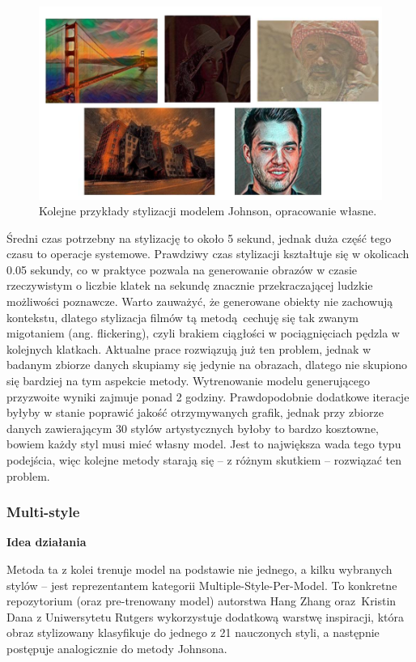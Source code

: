 \documentclass[12pt]{article}
\begin{document}
\begin{figure}[H]
    \centering
    \includegraphics[width=\textwidth]{u23.png}
    \caption{Kolejne przykłady stylizacji modelem Johnson, opracowanie własne.}
    \label{fig:15:2}
\end{figure}

Średni czas potrzebny na stylizację to około 5 sekund, jednak duża część tego czasu to operacje systemowe. Prawdziwy czas stylizacji kształtuje się w okolicach 0.05 sekundy, co w praktyce pozwala na generowanie obrazów w czasie rzeczywistym o liczbie klatek na sekundę znacznie przekraczającej ludzkie możliwości poznawcze. Warto zauważyć, że generowane obiekty nie zachowują kontekstu, dlatego stylizacja filmów tą metodą cechuję się tak zwanym migotaniem (ang. flickering), czyli brakiem ciągłości w pociągnięciach pędzla w kolejnych klatkach. Aktualne prace rozwiązują już ten problem, jednak w badanym zbiorze danych skupiamy się jedynie na obrazach, dlatego nie skupiono się bardziej na tym aspekcie metody. Wytrenowanie modelu generującego przyzwoite wyniki zajmuje ponad 2 godziny. Prawdopodobnie dodatkowe iteracje byłyby w stanie poprawić jakość otrzymywanych grafik, jednak przy zbiorze danych zawierającym 30 stylów artystycznych byłoby to bardzo kosztowne, bowiem każdy styl musi mieć własny model. Jest to największa wada tego typu podejścia, więc kolejne metody starają się – z różnym skutkiem – rozwiązać ten problem.

\subsubsection{Multi-style}

\noindent\textbf{Idea działania}

Metoda ta z kolei trenuje model na podstawie nie jednego, a kilku wybranych stylów – jest reprezentantem kategorii Multiple-Style-Per-Model. To konkretne repozytorium (oraz pre-trenowany model) autorstwa Hang Zhang oraz Kristin Dana z Uniwersytetu Rutgers wykorzystuje dodatkową warstwę inspiracji, która obraz stylizowany klasyfikuje do jednego z 21 nauczonych styli, a następnie postępuje analogicznie do metody Johnsona.
\end{document}
